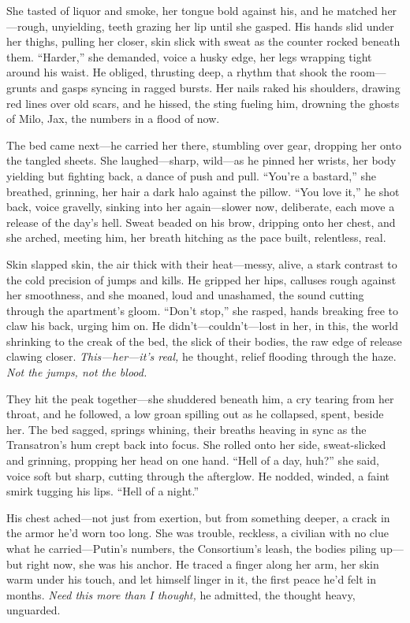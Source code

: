 \documentclass[12pt]{book}
\begin{document}
She tasted of liquor and smoke, her tongue bold against his, and he matched her—rough, unyielding, teeth grazing her lip until she gasped. His hands slid under her thighs, pulling her closer, skin slick with sweat as the counter rocked beneath them. “Harder,” she demanded, voice a husky edge, her legs wrapping tight around his waist. He obliged, thrusting deep, a rhythm that shook the room—grunts and gasps syncing in ragged bursts. Her nails raked his shoulders, drawing red lines over old scars, and he hissed, the sting fueling him, drowning the ghosts of Milo, Jax, the numbers in a flood of now.

The bed came next—he carried her there, stumbling over gear, dropping her onto the tangled sheets. She laughed—sharp, wild—as he pinned her wrists, her body yielding but fighting back, a dance of push and pull. “You’re a bastard,” she breathed, grinning, her hair a dark halo against the pillow. “You love it,” he shot back, voice gravelly, sinking into her again—slower now, deliberate, each move a release of the day’s hell. Sweat beaded on his brow, dripping onto her chest, and she arched, meeting him, her breath hitching as the pace built, relentless, real.

Skin slapped skin, the air thick with their heat—messy, alive, a stark contrast to the cold precision of jumps and kills. He gripped her hips, calluses rough against her smoothness, and she moaned, loud and unashamed, the sound cutting through the apartment’s gloom. “Don’t stop,” she rasped, hands breaking free to claw his back, urging him on. He didn’t—couldn’t—lost in her, in this, the world shrinking to the creak of the bed, the slick of their bodies, the raw edge of release clawing closer. \textit{This—her—it’s real,} he thought, relief flooding through the haze. \textit{Not the jumps, not the blood.}

They hit the peak together—she shuddered beneath him, a cry tearing from her throat, and he followed, a low groan spilling out as he collapsed, spent, beside her. The bed sagged, springs whining, their breaths heaving in sync as the Transatron’s hum crept back into focus. She rolled onto her side, sweat-slicked and grinning, propping her head on one hand. “Hell of a day, huh?” she said, voice soft but sharp, cutting through the afterglow. He nodded, winded, a faint smirk tugging his lips. “Hell of a night.”

His chest ached—not just from exertion, but from something deeper, a crack in the armor he’d worn too long. She was trouble, reckless, a civilian with no clue what he carried—Putin’s numbers, the Consortium’s leash, the bodies piling up—but right now, she was his anchor. He traced a finger along her arm, her skin warm under his touch, and let himself linger in it, the first peace he’d felt in months. \textit{Need this more than I thought,} he admitted, the thought heavy, unguarded.
\end{document}
